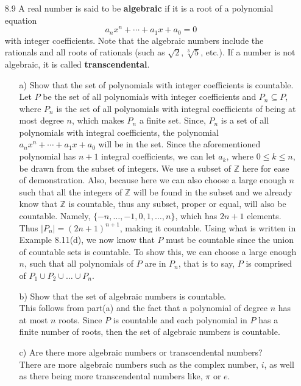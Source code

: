 \documentclass[12pt]{article}
\begin{document}
\begin{enumerate}
\item[8.9] A real number is said to be {\bf algebraic} if it is a root of a polynomial equation
\[
a_nx^n + \cdots + a_1x + a_0 = 0
\]
with integer coefficients. Note that the algebraic numbers include the rationals and all roots of rationals (such as $\sqrt{2}, \sqrt[3]{5}$, etc.). If a number is not algebraic, it is called {\bf transcendental}.
\begin{enumerate}
\item[a)] Show that the set of polynomials with integer coefficients is countable.\\
Let $P$ be the set of all polynomials with integer coefficients and $P_n \subseteq P$, 
where $P_n$ is the set of all polynomials with integral coefficients of being at most degree $n$, which makes $P_n$ a finite set. Since, $P_n$ is a set of all polynomials with integral coefficients, the polynomial $a_nx^n + \cdots + a_1x + a_0$ will be in the set. Since the
aforementioned polynomial has $n + 1$ integral coefficients, we can let $a_k$, where $0 \leq k \leq n$, be drawn from the subset of integers. We use a subset of $\mathbb{Z}$ here for ease of demonstration. Also, because here we can also choose a large enough $n$ such that all the integers of $\mathbb{Z}$ will be found in the subset and we already know that $\mathbb{Z}$ is countable, thus any subset, proper or equal, will also be countable. Namely, $\{-n, \ldots, -1, 0, 1, \ldots ,n\}$, which has $2n + 1$ elements. \\
Thus $|P_n| = (2n + 1)^{n + 1}$, making it countable. Using what is written in Example 8.11(d), we now know that $P$ must be countable since the union of countable sets is countable. To show this, we can choose a large enough $n$, such that all polynomials of $P$ are in $P_n$, that is to say, $P$ is comprised of $P_1 \cup P_2 \cup \ldots \cup P_n$.
\item[b)] Show that the set of algebraic numbers is countable.\\
This follows from part(a) and the fact that a polynomial of degree $n$ has at most
$n$ roots. Since $P$ is countable and each polynomial in $P$ has a finite number of roots,
then the set of algebraic numbers is countable.
\item[c)] Are there more algebraic numbers or transcendental numbers?\\
There are more algebraic numbers such as the complex number, $i$, as well as there being more
transcendental numbers like, $\pi$ or $e$.
\end{enumerate}


\end{enumerate}
\end{document}
